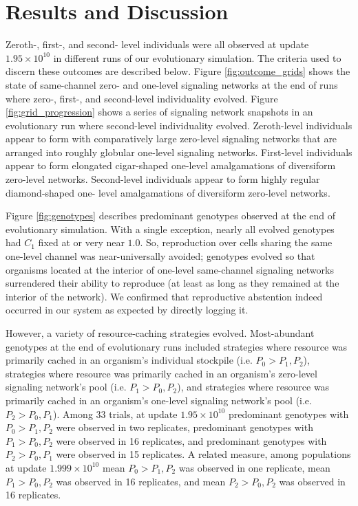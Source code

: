 \section{Results and Discussion}














Zeroth-, first-, and second- level individuals were all observed at update $1.95 \times 10^{10}$ in different runs of our evolutionary simulation.
The criteria used to discern these outcomes are described below.
Figure \ref{fig:outcome_grids} shows the state of same-channel zero- and one-level signaling networks at the end of runs where zero-, first-, and second-level individuality evolved.
Figure \ref{fig:grid_progression} shows a series of signaling network snapshots in an evolutionary run where second-level individuality evolved.
Zeroth-level individuals appear to form with comparatively large zero-level signaling networks that are arranged into roughly globular one-level signaling networks.
First-level individuals appear to form elongated cigar-shaped one-level amalgamations of diversiform zero-level networks.
Second-level individuals appear to form highly regular diamond-shaped one- level amalgamations of diversiform zero-level networks.

Figure \ref{fig:genotypes} describes predominant genotypes observed at the end of evolutionary simulation.
With a single exception, nearly all evolved genotypes had $C_1$ fixed at or very near $1.0$.
So, reproduction over cells sharing the same one-level channel was near-universally avoided;
genotypes evolved so that organisms located at the interior of one-level same-channel signaling networks surrendered their ability to reproduce (at least as long as they remained at the interior of the network).
We confirmed that reproductive abstention indeed occurred in our system as expected by directly logging it.

However, a variety of resource-caching strategies evolved.
Most-abundant genotypes at the end of evolutionary runs included strategies where resource was primarily cached in an organism's individual stockpile (i.e. $P_0 > P_1, P_2$), strategies where resource was primarily cached in an organism's zero-level signaling network's pool (i.e. $P_1 > P_0, P_2$), and strategies where resource was primarily cached in an organism's one-level signaling network's pool (i.e. $P_2 > P_0, P_1$).
Among 33 trials, at update $1.95 \times 10^{10}$ predominant genotypes with $P_0 > P_1, P_2$ were observed in two replicates, predominant genotypes with $P_1 > P_0, P_2$ were observed in 16 replicates, and predominant genotypes with $P_2 > P_0, P_1$ were observed in 15 replicates.
A related measure, among populations at update $1.999 \times 10^{10}$ mean $P_0 > P_1, P_2$ was observed in one replicate, mean $P_1 > P_0, P_2$ was observed in 16 replicates, and mean $P_2 > P_0, P_2$ was observed in 16 replicates.

